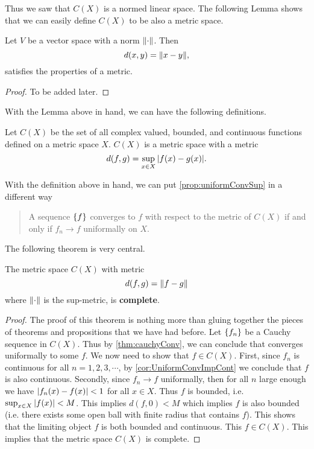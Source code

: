 Thus we saw that $ C(X) $ is a normed linear space. The following Lemma shows that we can easily define $ C(X) $ to be also a metric space. 

\begin{lemma}
	Let $ V $ be a vector space with a norm $ \norm{\cdot} $. Then
	\[ d(x,y) = \norm{x-y}, \]
	satisfies the properties of a metric.
\end{lemma}
\begin{proof}
	To be added later.
\end{proof}

With the Lemma above in hand, we can have the following definitions. 

\begin{definition}
	Let $ C(X) $ be the set of all complex valued, bounded, and continuous functions defined on a metric space $ X $. $ C(X) $ is a metric space with a metric
	\[ d(f,g) = \sup_{x \in X}|f(x)-g(x)|. \]
\end{definition}

With the definition above in hand, we can put \autoref{prop:uniformConvSup} in a different way

\begin{quote}
	A sequence $ \{f\} $ converges to $ f $ with respect to the metric of $ C(X) $ if and only if $ f_n \to f $ uniformally on $ X $.
\end{quote}
The following theorem is very central.
\begin{theorem}
	The metric space $  C(X) $ with metric
	\[ d(f,g) = \norm{f-g} \]
	where $ \norm{\cdot} $ is the sup-metric, is \textbf{complete}.
\end{theorem}
\begin{proof}
	The proof of this theorem is nothing more than gluing together the pieces of theorems and propositions that we have had before. Let $ \{f_n\} $ be a Cauchy sequence in $ C(X) $. Thus by \autoref{thm:cauchyConv}, we can conclude that converges uniformally to some $ f $. We now need to show that $  f\in C(X) $. First, since $ f_n $ is continuous for all $ n = 1,2,3,\cdots $, by \autoref{cor:UniformConvImpCont} we conclude that $ f $ is also continuous. Secondly, since $ f_n \to f $ uniformally, then for all $ n $ large enough we have
	$ |f_n(x) - f(x)| < 1 $ for all $  x\in X $. Thus $ f $ is bounded, i.e. $ \sup_{x\in X}|f(x)| < M $. This implies $ d(f,0) < M $ which implies $ f $ is also bounded (i.e. there exists some open ball with finite radius that contains $ f $). This shows that the limiting object $ f $ is both bounded and continuous. This $ f \in C(X) $. This implies that the metric space $ C(X) $ is complete. 
\end{proof}



\newpage
